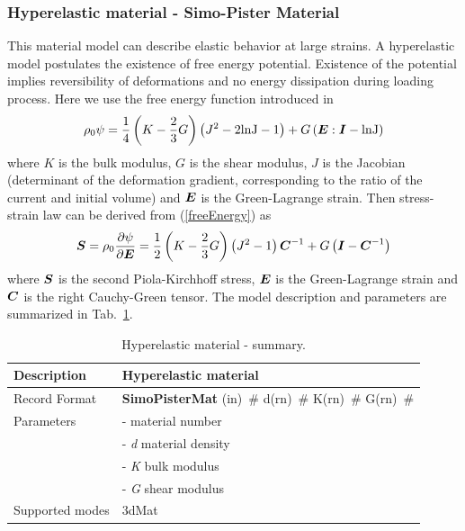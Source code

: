 \documentclass[a4paper]{article}
\newcommand{\mbf}[1]{\mbox{\boldmath$#1$}}
\newcommand{\descitem}[1]{{\noindent \bf #1}}
\newcommand{\elemparam}[2]{{{#1\tiny (#2)}~\#}}
\newcommand{\param}[1]{{\it #1}}
\newenvironment{mmt}{\begin{tabular}{|l|p{9cm}|}}{\end{tabular}\\}
\newenvironment{mmt}{\begin{tabular}{|l|l|}}{\end{tabular}\\}
\begin{document}
\subsubsection{Hyperelastic material - Simo-Pister Material}
This material model can describe elastic behavior at large strains.
A hyperelastic model postulates the existence of free energy potential. Existence of the potential implies reversibility of deformations and no energy dissipation during loading process. Here we use the free energy function introduced in \cite{SimoHughes}
\begin{equation}\label{freeEnergy}
\rho_0 \psi = \frac{1}{4} \left(K - \frac{2}{3}G \right) \left( J^2 - 2 \rm{ln}J -1\right) + G \left(\mbf{E}:\mbf{I} - \rm{ln}J \right)
\end{equation}
where $K$ is the bulk modulus, $G$ is the shear modulus, $J$ is the Jacobian (determinant of the deformation gradient, corresponding to the ratio of the current and initial volume) and $\mbf{E}$ is the Green-Lagrange strain.
Then stress-strain law can be derived from (\ref{freeEnergy}) as
\begin{equation}
\mbf{S} = \rho_0 \frac{\partial \psi}{\partial \mbf{E}} = \frac{1}{2}\left(K - \frac{2}{3}G \right) \left(J^2 -1 \right)\mbf{C}^{-1} + G \left(\mbf{I} -\mbf{C}^{-1} \right)
\end{equation}
where $\mbf{S}$ is the second Piola-Kirchhoff stress, $\mbf{E}$ is the Green-Lagrange strain and $\mbf{C}$ is the right Cauchy-Green tensor.
The model description and parameters are summarized in Tab.~\ref{hyperElMat_table}.
\begin{table}[!htb]
\begin{mmt}
\hline
Description & Hyperelastic material\\
\hline
Record Format & \descitem{SimoPisterMat}  \elemparam{}{in}
\elemparam{d}{rn} \elemparam{K}{rn} \elemparam{G}{rn} \\
Parameters &- \param{} material number\\
&- \param{d} material density\\
&- \param{K} bulk modulus\\
&- \param{G} shear modulus\\
Supported modes& 3dMat\\
\hline
\end{mmt}
\caption{Hyperelastic material - summary.}
\label{hyperElMat_table}
\end{table}
\end{document}
